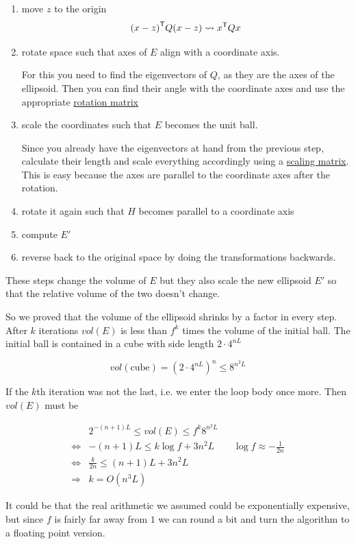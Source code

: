 \begin{enumerate}
\item move $z$ to the origin
\[{(x-z)}^\text{\upshape \sffamily T}Q(x-z) \rightsquigarrow {x}^\text{\upshape \sffamily T}Qx\]
\item rotate space such that axes of $E$ align with a coordinate axis. 

For this you need to find the eigenvectors of $Q$, as they are the axes of the ellipsoid. Then you can find their angle with the coordinate axes and use the appropriate \href{http://en.wikipedia.org/wiki/Rotation\_matrix}{rotation matrix}
\item scale the coordinates such that $E$ becomes the unit ball.

Since you already have the eigenvectors at hand from the previous step, calculate their length and scale everything accordingly using a \href{http://en.wikipedia.org/wiki/Scaling\_matrix}{scaling matrix}. This is easy because the axes are parallel to the coordinate axes after the rotation.
\item rotate it again such that $H$ becomes parallel to a coordinate axis
\item compute $E'$
\item reverse back to the original space by doing the transformations backwards.
\end{enumerate}

These steps change the volume of $E$ but they also scale the new ellipsoid $E'$ so that the relative volume of the two doesn't change.

So we proved that the volume of the ellipsoid shrinks by a factor in every step. After $k$ iterations $vol(E)$ is less than $f^k$ times the volume of the initial ball. The initial ball is contained in a cube with side length $2\cdot 4^{nL}$

\[vol(\text{cube}) = (2 \cdot 4^{nL})^n \leq 8^{n^2L}\]

If the $k$th iteration was not the last, i.e. we enter the loop body once more. Then $vol(E)$ must be

\begin{align*}
&2^{-(n+1)L} \leq vol(E) \leq f^k 8^{n^2L} \\
\Leftrightarrow & -(n+1)L  \leq k\log f + 3n^2 L && \log f \approx -\frac{1}{2n}\\
\Leftrightarrow & \frac{k}{2n} \leq (n+1)L+3n^2L \\
\Rightarrow &k = O(n^3L)
\end{align*}

It could be that the real arithmetic we assumed could be exponentially expensive, but since $f$ is fairly far away from $1$ we can round a bit and turn the algorithm to a floating point version.


